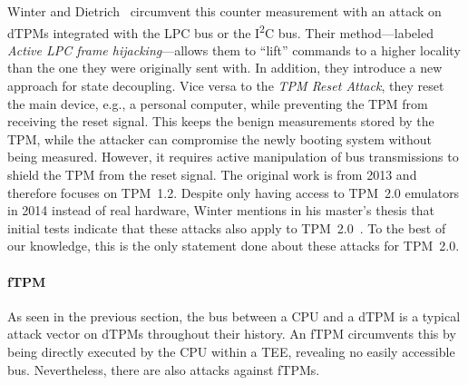 Winter and Dietrich~\cite{Winter2013} circumvent this counter measurement with an attack on \acp{dTPM} integrated with the LPC bus or the I\textsuperscript{2}C bus.
Their method---labeled \emph{Active LPC frame hijacking}---allows them to ``lift'' commands to a higher locality than the one they were originally sent with.
In addition, they introduce a new approach for state decoupling.
Vice versa to the \emph{TPM Reset Attack}, they reset the main device, e.g., a personal computer, while preventing the TPM from receiving the reset signal.
This keeps the benign measurements stored by the TPM, while the attacker can compromise the newly booting system without being measured.
However, it requires active manipulation of bus transmissions to shield the \ac{TPM} from the reset signal.
The original work is from 2013 and therefore focuses on TPM~1.2.
Despite only having access to TPM~2.0 emulators in 2014 instead of real hardware, Winter mentions in his master's thesis that initial tests indicate that these attacks also apply to TPM~2.0~\cite{winterMA2014}.
To the best of our knowledge, this is the only statement done about these attacks for TPM~2.0.



\paragraph{\Acl{fTPM}}

As seen in the previous section, the bus between a CPU and a \ac{dTPM} is a typical attack vector on \acp{dTPM} throughout their history.
An \ac{fTPM} circumvents this by being directly executed by the CPU within a \ac{TEE}, revealing no easily accessible bus.
Nevertheless, there are also attacks against \acp{fTPM}.

